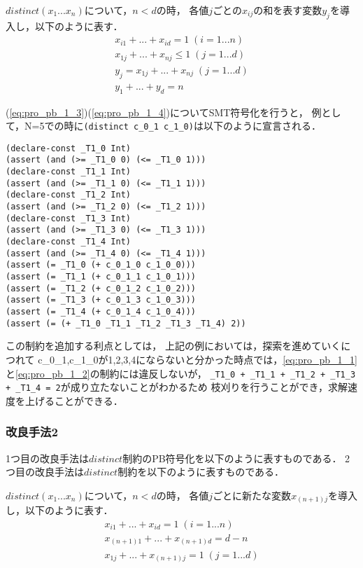 $distinct(x_1 ... x_n)$について，$n < d$の時，
各値$j$ごとの$x_{ij}$の和を表す変数$y_j$を導入し，以下のように表す．
\begin{eqnarray}
    x_{i1} + ... + x_{id}=1 \; (i=1 ... n) \label{eq:pro_pb_1_1}\\
    x_{1j} + ... + x_{nj}\leq1 \; (j=1 ... d) \label{eq:pro_pb_1_2}\\
    y_j = x_{1j} + ... + x_{nj} \; (j=1 ... d) \label{eq:pro_pb_1_3}\\
    y_1 + ... + y_d =n \label{eq:pro_pb_1_4}
\end{eqnarray}

(\ref{eq:pro_pb_1_3})(\ref{eq:pro_pb_1_4})についてSMT符号化を行うと，
例として，N=5での時に\verb|(distinct c_0_1 c_1_0)|は以下のように宣言される．

\begin{verbatim}
(declare-const _T1_0 Int)
(assert (and (>= _T1_0 0) (<= _T1_0 1)))
(declare-const _T1_1 Int)
(assert (and (>= _T1_1 0) (<= _T1_1 1)))
(declare-const _T1_2 Int)
(assert (and (>= _T1_2 0) (<= _T1_2 1)))
(declare-const _T1_3 Int)
(assert (and (>= _T1_3 0) (<= _T1_3 1)))
(declare-const _T1_4 Int)
(assert (and (>= _T1_4 0) (<= _T1_4 1)))
(assert (= _T1_0 (+ c_0_1_0 c_1_0_0)))
(assert (= _T1_1 (+ c_0_1_1 c_1_0_1)))
(assert (= _T1_2 (+ c_0_1_2 c_1_0_2)))
(assert (= _T1_3 (+ c_0_1_3 c_1_0_3)))
(assert (= _T1_4 (+ c_0_1_4 c_1_0_4)))
(assert (= (+ _T1_0 _T1_1 _T1_2 _T1_3 _T1_4) 2))
\end{verbatim}

この制約を追加する利点としては，
上記の例においては，探索を進めていくにつれて
c\_0\_1,c\_1\_0が1,2,3,4にならないと分かった時点では，\ref{eq:pro_pb_1_1}と\ref{eq:pro_pb_1_2}の制約には違反しないが，
\verb|_T1_0 + _T1_1 + _T1_2 + _T1_3 + _T1_4 = 2|が成り立たないことがわかるため
枝刈りを行うことができ，求解速度を上げることができる．

\subsubsection{改良手法2}\label{sec:pro_hint_3_2}
1つ目の改良手法は$distinct$制約のPB符号化を以下のように表すものである．
2つ目の改良手法は$distinct$制約を以下のように表すものである．

$distinct(x_1 ... x_n)$について，$n < d$の時，
各値$j$ごとに新たな変数$x_{(n+1)j}$を導入し，以下のように表す．
\begin{eqnarray}
    x_{i1} + ... + x_{id}=1 \; (i=1 ... n) \label{eq:pro_pb_2_1}\\
    x_{(n+1)1} + ... + x_{(n+1)d}=d-n \label{eq:pro_pb_2_2}\\
    x_{1j} + ... + x_{(n+1)j}=1 \; (j=1 ... d) \label{eq:pro_pb_2_3}\\
\end{eqnarray}

